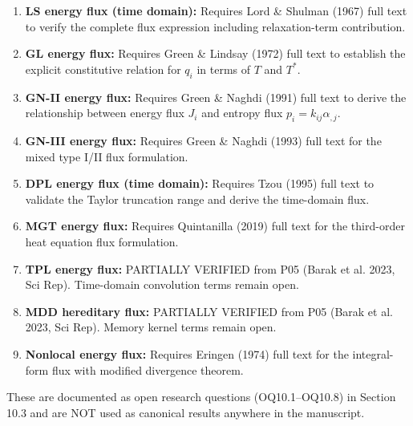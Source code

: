 \begin{enumerate}
\item \textbf{LS energy flux (time domain):} Requires Lord \& Shulman (1967) full text to verify the complete flux expression including relaxation-term contribution.
\item \textbf{GL energy flux:} Requires Green \& Lindsay (1972) full text to establish the explicit constitutive relation for $q_i$ in terms of $T$ and $T^*$.
\item \textbf{GN-II energy flux:} Requires Green \& Naghdi (1991) full text to derive the relationship between energy flux $J_i$ and entropy flux $p_i = k_{ij}\alpha_{,j}$.
\item \textbf{GN-III energy flux:} Requires Green \& Naghdi (1993) full text for the mixed type I/II flux formulation.
\item \textbf{DPL energy flux (time domain):} Requires Tzou (1995) full text to validate the Taylor truncation range and derive the time-domain flux.
\item \textbf{MGT energy flux:} Requires Quintanilla (2019) full text for the third-order heat equation flux formulation.
\item \textbf{TPL energy flux:} PARTIALLY VERIFIED from P05 (Barak et al. 2023, Sci Rep). Time-domain convolution terms remain open.
\item \textbf{MDD hereditary flux:} PARTIALLY VERIFIED from P05 (Barak et al. 2023, Sci Rep). Memory kernel terms remain open.
\item \textbf{Nonlocal energy flux:} Requires Eringen (1974) full text for the integral-form flux with modified divergence theorem.
\end{enumerate}

These are documented as open research questions (OQ10.1--OQ10.8) in Section 10.3 and are NOT used as canonical results anywhere in the manuscript.

